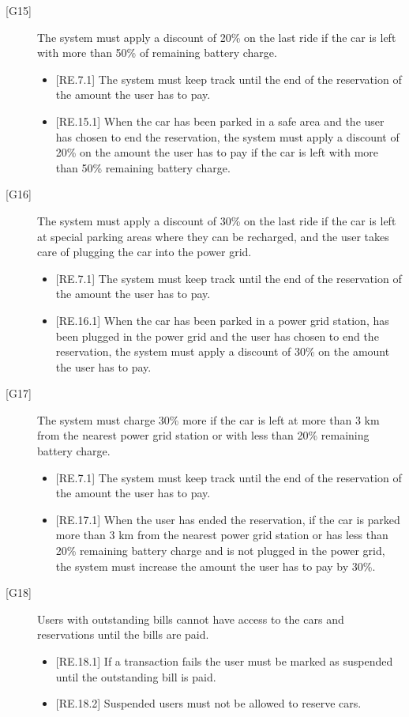 \documentclass[english]{article}
\begin{document}
\begin{description}
\item[{[G15]}]{The system must apply a discount of 20\% on the last ride if the car is left with more than 50\% of remaining battery charge.
\begin{itemize}
	\item{[RE.7.1] The system must keep track until the end of the reservation of the amount the user has to pay.}
	\item{[RE.15.1] When the car has been parked in a safe area and the user has chosen to end the reservation, the system must apply a discount of 20\% on the amount the user has to pay if the car is left with more than 50\% remaining battery charge.}
\end{itemize}
}

\item[{[G16]}]{The system must apply a discount of 30\% on the last ride if the car is left at special parking areas where they can be recharged, and the user takes care of plugging the car into the power grid.
\begin{itemize}
	\item{[RE.7.1] The system must keep track until the end of the reservation of the amount the user has to pay.}
	\item{[RE.16.1] When the car has been parked in a power grid station, has been plugged in the power grid and the user has chosen to end the reservation, the system must apply a discount of 30\% on the amount the user has to pay.}
\end{itemize}
}

\item[{[G17]}]{The system must charge 30\% more if the car is left at more than 3 km from the nearest power grid station or with less than 20\% remaining battery charge.
\begin{itemize}
	\item{[RE.7.1] The system must keep track until the end of the reservation of the amount the user has to pay.}
	\item{[RE.17.1] When the user has ended the reservation, if the car is parked more than 3 km from the nearest power grid station or has less than 20\% remaining battery charge and is not plugged in the power grid, the system must increase the amount the user has to pay by 30\%.}
\end{itemize}
}

\item[{[G18]}]{Users with outstanding bills cannot have access to the cars and reservations until the bills are paid.
\begin{itemize}
	\item{[RE.18.1] If a transaction fails the user must be marked as suspended until the outstanding bill is paid.}
	\item{[RE.18.2] Suspended users must not be allowed to reserve cars.}
\end{itemize}
}


\end{description}
\end{document}
